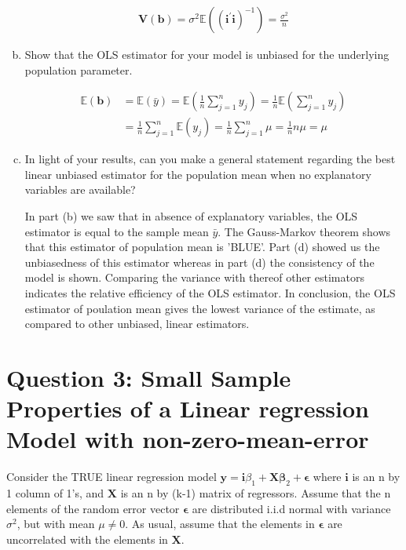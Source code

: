 \documentclass[11pt,reqno]{article}   %
\newcommand{\mlt}[1]{\mathbf{#1}} %
\newcommand{\mgr}[1]{\boldsymbol{#1}}%
\newcommand{\kl}{\left(}
\newcommand{\kr}{\right)}
\newcommand{\kbeta}{\mgr{\beta}}
\newcommand{\kt}{^{\prime}}
\newcommand{\kkeps}{\mgr{\epsilon}}
\newcommand{\kX}{\mlt{X}}
\newcommand{\kV}{\mlt{V}}
\newcommand{\ky}{\mlt{y}}
\newcommand{\kb}{\mlt{b}}
\newcommand{\ki}{\mlt{i}}
\begin{document}
\begin{enumerate}[(a)]
\begin{equation}
\begin{split}
\kV(\kb) = \sigma^2 \mathbb{E}(\kl \mlt{i}\kt\mlt{i} \kr^{-1}) = \frac{\sigma^2}{n}
\end{split}
\end{equation}

\item
Show that the OLS estimator for your model is unbiased for the underlying population parameter.

\begin{equation}
\begin{split}
\mathbb{E}(\kb) & = \mathbb{E}(\bar{y}) = \mathbb{E}(\frac{1}{n}\sum^n_{j=1}y_j) = \frac{1}{n}\mathbb{E}(\sum^n_{j=1}y_j) \\ & = \frac{1}{n}\sum^n_{j=1}\mathbb{E}(y_j) = \frac{1}{n}\sum^n_{j=1}\mu = \frac{1}{n}n\mu = \mu
\end{split}
\end{equation}

\item
In light of your results, can you make a general statement regarding the best linear unbiased
 estimator for the population mean when no explanatory variables are available?
 
 In part (b) we saw that in absence of explanatory variables, the OLS estimator is equal to the sample mean $\bar{y}$. The Gauss-Markov theorem shows that this estimator of population mean is 'BLUE'. Part (d) showed us the unbiasedness of this estimator whereas in part (d) the consistency of the model is shown. Comparing the variance with thereof other estimators indicates the relative efficiency of the OLS estimator. In conclusion, the OLS estimator of poulation mean gives the lowest variance of the estimate, as compared to other unbiased, linear estimators.
\end{enumerate}

\section*{Question 3: Small Sample Properties of a
Linear regression Model with non-zero-mean-error}
Consider the TRUE linear regression model $\ky=\ki\beta_1 + \kX\kbeta_2+\kkeps$
 where $\ki$ is an n by 1 column of 1's, and $\kX$ is an n by (k-1) matrix of regressors.
 Assume that the n elements of the random error vector $\kkeps$ are distributed
 i.i.d normal with variance $\sigma^2$, but with mean $\mu \neq 0$. As usual,
 assume that the elements in $\kkeps$ are uncorrelated with the elements in $\kX$.
\end{document}
